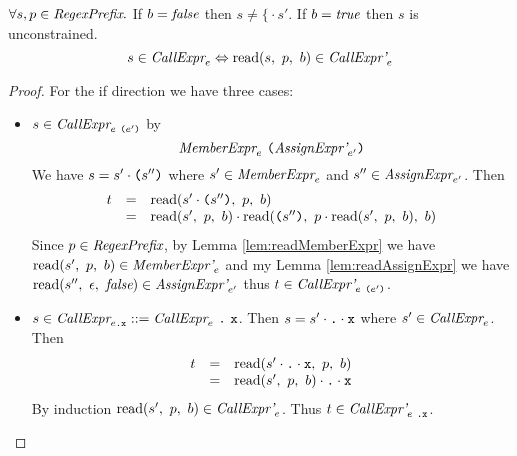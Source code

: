 \documentclass[onecolumn]{sigplanconf-onecolumn}
\begin{document}
\begin{lemma}\mbox{}
  
  \( \forall s, p \in \textit{RegexPrefix}. \)
  If \( b = \textit{false} \) then \( s \not = \texttt{\{} \cdot s' \). If \(
  b = \textit{true} \) then \( s \) is unconstrained.
  \[ 
  s \in \textit{CallExpr}_{e} \Leftrightarrow 
  \textrm{read}(s,~p,~b) \in \textit{CallExpr'}_{e} 
  \]
\end{lemma}
\begin{proof}
  For the if direction we have three cases:
  \begin{itemize}
  \item \( s \in \textit{CallExpr}_{e~\texttt{(}e'\texttt{)}} \) by
    \[
    \textit{MemberExpr}_{e}~\texttt{(}\textit{AssignExpr'}_{e'}\texttt{)}
    \]
    We have \( s = s' \cdot \texttt{(}s''\texttt{)} \) where \( s' \in
    \textit{MemberExpr}_{e} \) and \( s'' \in
    \textit{AssignExpr}_{e'} \). Then
    \[
    \begin{array}{rcl}
      t &=& \textrm{read}(s' \cdot \texttt{(}s''\texttt{)},~p,~b)
      \\
      &=& \textrm{read}(s',~p,~b) \cdot
      \textrm{read}(\texttt{(}s''\texttt{)},~
        p \cdot \textrm{read}(s',~p,~b)
      ,~b)
    \end{array}
    \]
    Since \( p \in \textit{RegexPrefix} \), by Lemma
    \ref{lem:readMemberExpr} we have \( \textrm{read}(s',~p,~b) \in
    \textit{MemberExpr'}_{e} \) and my Lemma
    \ref{lem:readAssignExpr} we have
    \(\textrm{read}(s'',~\epsilon,~\textit{false}) \in
    \textit{AssignExpr'}_{e'} \) thus \( t \in
    \textit{CallExpr'}_{e~\texttt{(}e'\texttt{)}} \).

  \item \( s \in \textit{CallExpr}_{e\texttt{.\texttt{x}}} ::=
    \textit{CallExpr}_{e} ~\texttt{.} ~\texttt{x} \). Then
    \( s = s' \cdot \texttt{.}\cdot \texttt{x} \) where \( s' \in
    \textit{CallExpr}_{e} \). Then
    \[
    \begin{array}{rcl}
      t &=& \textrm{read}(s' \cdot \texttt{.} \cdot \texttt{x},~p,~b)
      \\
      &=& \textrm{read}(s',~p,~b) \cdot \texttt{.}\cdot \texttt{x}
    \end{array}
    \]
    By induction \( \textrm{read}(s',~p,~b) \in \textit{CallExpr'}_{e}
    \). Thus \( t \in \textit{CallExpr'}_{e~\texttt{.\texttt{x}}} \).
  \end{itemize}
\end{proof}
\end{document}
